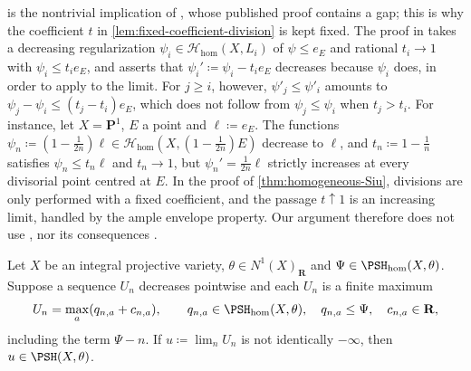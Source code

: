 \documentclass[11pt,a4paper]{article}
\newcommand{\PSHhom}{\PSH_{\mathrm{hom}}}          %
\begin{document}
\begin{remark}\label{rem:BJ-6-21}
 is the nontrivial implication of \cite[Theorem~6.21]{BJ22}, whose published proof contains a gap; this is why the coefficient $t$ in \cref{lem:fixed-coefficient-division} is kept fixed. The proof in \cite{BJ22} takes a decreasing regularization $\psi_i\in\mathcal{H}_{\mathrm{hom}}(X,L_i)$ of $\psi\le e_E$ and rational $t_i\to1$ with $\psi_i\le t_ie_E$, and asserts that $\psi_i'\coloneqq\psi_i-t_ie_E$ decreases because $\psi_i$ does, in order to apply \cite[Theorem~4.5]{BJ22} to the limit. For $j\ge i$, however, $\psi'_j\le\psi'_i$ amounts to $\psi_j-\psi_i\le(t_j-t_i)e_E$, which does not follow from $\psi_j\le\psi_i$ when $t_j>t_i$. For instance, let $X=\mathbf P^1$, $E$ a point and $\ell\coloneqq e_E$. The functions $\psi_n\coloneqq(1-\frac1{2n})\ell\in\mathcal{H}_{\mathrm{hom}}(X,(1-\frac1{2n})E)$ decrease to $\ell$, and $t_n\coloneqq1-\frac1n$ satisfies $\psi_n\le t_n\ell$ and $t_n\to1$, but $\psi_n'=\frac1{2n}\ell$ strictly increases at every divisorial point centred at $E$. In the proof of \cref{thm:homogeneous-Siu}, divisions are only performed with a fixed coefficient, and the passage $t\uparrow1$ is an increasing limit, handled by the ample envelope property. Our argument therefore does not use \cite[Theorem~6.21]{BJ22}, nor its consequences \cite[Corollaries~6.22, 6.41 and Theorems~6.31, 6.35, 6.40]{BJ22}.
\end{remark}

\begin{lemma}\label{lem:homogeneous-carrier-limit}
Let $X$ be an integral projective variety, $\theta\in N^1(X)_{\mathbf R}$ and $\Psi\in\PSHhom(X,\theta)$. Suppose a sequence $U_n$ decreases pointwise and each $U_n$ is a finite maximum
\[
 U_n=\max_a(q_{n,a}+c_{n,a}),
 \qquad q_{n,a}\in\PSHhom(X,\theta),\quad q_{n,a}\le\Psi,
 \quad c_{n,a}\in\mathbf R,
\]
including the term $\Psi-n$. If $u\coloneqq\lim_nU_n$ is not identically $-\infty$, then $u\in\PSH(X,\theta)$.
\end{lemma}
\end{document}
